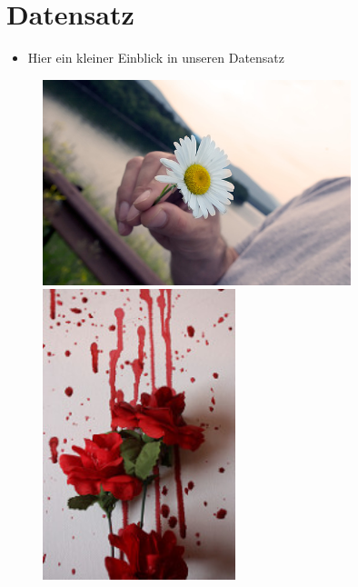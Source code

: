 \documentclass[t]{beamer}
\begin{document}
\section{Datensatz}
\begin{frame}
    \begin{itemize}
        \item Hier ein kleiner Einblick in unseren Datensatz
    \end{itemize}
    \begin{figure}
        \centering
        \begin{minipage}{0.4\textwidth}
            \centering
            \includegraphics[width=0.8\textwidth]{./teach-plots/dandelion.jpg} %
        \end{minipage}\hfill
        \begin{minipage}{0.4\textwidth}
            \centering
            \includegraphics[width=0.5\textwidth]{./teach-plots/rose.jpg} %

\end{minipage}
\end{figure}
\end{frame}
\end{document}
